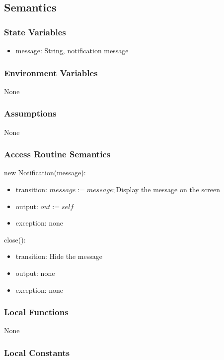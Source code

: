 \documentclass[12pt, titlepage]{article}
\begin{document}
\subsection{Semantics}

\subsubsection{State Variables}

\begin{itemize}
\item message: String, notification message
\end{itemize}

\subsubsection{Environment Variables}

None

\subsubsection{Assumptions}

None

\subsubsection{Access Routine Semantics}

\noindent new Notification(message):
\begin{itemize}
\item transition: $message := message;$Display the message on the screen
\item output: $out := self$
\item exception: none
\end{itemize}

\noindent close():
\begin{itemize}
\item transition: Hide the message
\item output: none
\item exception: none
\end{itemize}
\subsubsection{Local Functions}

None

\subsubsection{Local Constants}
\end{document}
